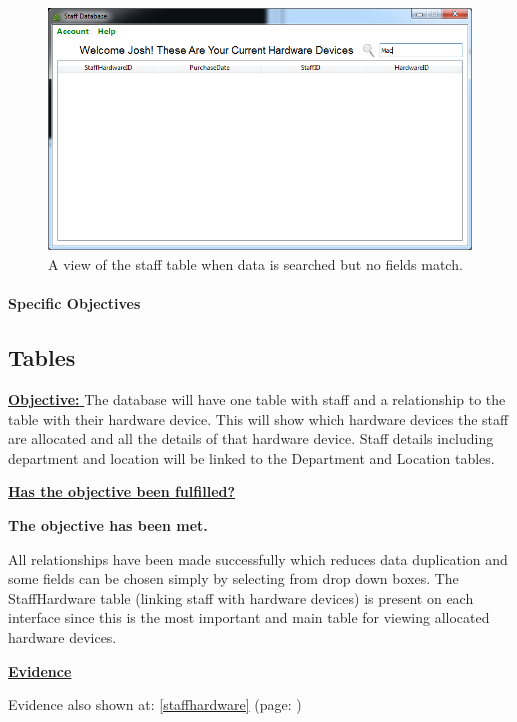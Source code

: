 \begin{figure}[H]
    \includegraphics[width=\textwidth]{./Evaluation/Images/staffsearch2.png}
    \caption{A view of the staff table when data is searched but no fields match.} 
\end{figure}



\paragraph{Specific Objectives}

\subsection{Tables}

\underline{\textbf{Objective:} } The database will have one table with staff and a relationship to the table with their hardware device. This will show which hardware devices the staff are allocated and all the details of that hardware device. Staff details including department and location will be linked to the Department and Location tables.

\underline{\textbf{Has the objective been fulfilled?}}

\textbf{The objective has been met.}

All relationships have been made successfully which reduces data duplication and some fields can be chosen simply by selecting from drop down boxes. The StaffHardware table (linking staff with hardware devices) is present on each interface since this is the most important and main table for viewing allocated hardware devices.

\underline{\textbf{Evidence}}

Evidence also shown at: \ref{staffhardware} (page: \pageref{staffhardware}) 


